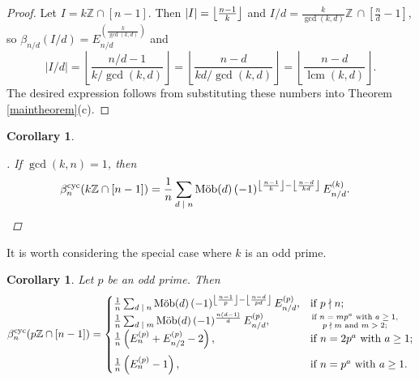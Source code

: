 \documentclass[12pt]{article}
\newcommand{\smallfrac}[2]{\textstyle\frac{#1}{#2}\displaystyle}
\newcommand{\betacyc}{\beta^{\text{cyc}}}
\DeclareMathOperator{\mob}{M\ddot{o}b}
\DeclareMathOperator{\lcm}{lcm}
\newtheorem{cor}[thm]{Corollary}
\theoremstyle{definition}
\renewcommand{\qedsymbol}{$\blacksquare$}
\begin{document}
\begin{proof} Let $I = k\mathbb{Z} \cap [n-1]$. Then $|I| = \left\lfloor\smallfrac{n-1}{k}\right\rfloor$ and $I/d = \smallfrac{k}{\gcd(k,d)}\mathbb{Z}\, \cap \left[\smallfrac{n}{d}-1\right]$, so $\beta_{n/d}(I/d) = E_{n/d}^{\left(\frac{k}{\gcd(k,d)}\right)}$ and
\[ |I/d| = \left\lfloor \frac{n/d-1}{k/\gcd(k,d)}\right\rfloor = \left\lfloor \frac{n-d}{kd/\gcd(k,d)}\right\rfloor = \left\lfloor \frac{n-d}{\lcm(k,d)}\right\rfloor. \]
The desired expression follows from substituting these numbers into Theorem \ref{maintheorem}(c). \end{proof}

\begin{cor} \label{gencor1}
\renewcommand{\qedsymbol}{$\square$}\begin{proof}[\nopunct\!\!\!]If $\gcd(k,n) = 1$, then
\begin{align*} \betacyc_n(k\mathbb{Z} \cap [n-1]) &= \frac{1}{n}\sum_{\text{$d\mid n$}} \mob(d)\,(-1)^{\left\lfloor\frac{n-1}{k}\right\rfloor - \left\lfloor\frac{n-d}{k d}\right\rfloor} \, E_{n/d}^{(k)}.\qedhere\end{align*}\end{proof}
\end{cor}

It is worth considering the special case where $k$ is an odd prime.

\begin{cor} \label{gencor2}
Let $p$ be an odd prime. Then
$$\betacyc_n(p\mathbb{Z} \cap [n-1]) = \begin{cases}
\frac{1}{n}\sum_{\text{$d \mid n$}} \mob(d)\, (-1)^{\left\lfloor\frac{n-1}{p}\right\rfloor - \left\lfloor\frac{n-d}{pd}\right\rfloor}\, E_{n/d}^{(p)}, & \text{if $p \nmid n$;}\\
\frac{1}{n}\sum_{\text{$d \mid m$}} \mob(d)\,(-1)^{\frac{n(d-1)}{d}}\,E_{n/d}^{(p)}, & {\text{if $n = m p^a$ with $a\ge1$,}\atop\text{$p\nmid m$ and $m > 2$;}}\\
\frac{1}{n}\left(E_n^{(p)} + E_{n/2}^{(p)} - 2\right), & \text{if $n = 2p^a$ with $a\ge1$;} \medskip \\
\frac{1}{n}\left(E_n^{(p)} - 1\right), & \text{if $n = p^a$ with $a\ge1$.}
\end{cases}$$
\end{cor}
\end{document}
